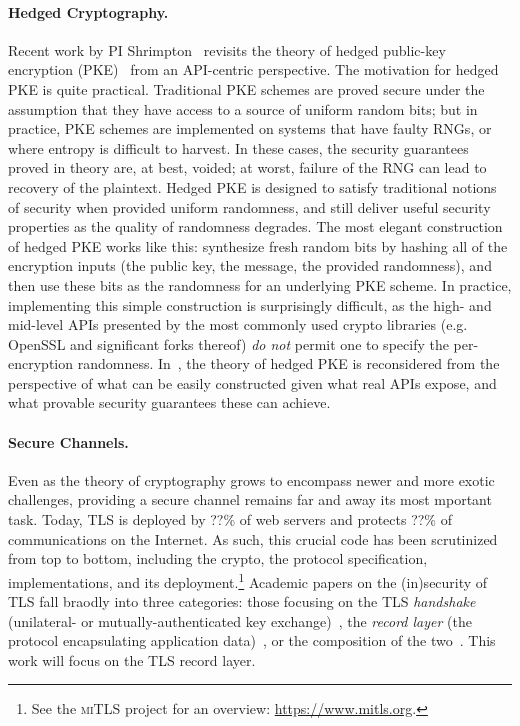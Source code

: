 \paragraph{Hedged Cryptography. }
Recent work by PI Shrimpton~\cite{BPS} revisits the theory of
hedged public-key encryption (PKE)~\cite{BBN+} from an API-centric perspective.
%
The motivation for hedged PKE is quite practical. Traditional
PKE schemes are proved secure under the assumption that they have access to a
source of uniform random bits; but in practice, PKE schemes are implemented on
systems that have faulty RNGs, or where entropy is difficult to harvest.  In
these cases, the security guarantees proved in theory are, at best, voided; at
worst, failure of the RNG can lead to recovery of the plaintext.
%
Hedged PKE is designed to satisfy traditional notions of security when provided
uniform randomness, and still deliver useful security properties as the quality
of randomness degrades.  The most elegant construction of hedged PKE works like
this: synthesize fresh random bits by hashing all of the encryption inputs (the
public key, the message, the provided randomness), and then use these bits as
the randomness for an underlying PKE scheme.  In practice, implementing this
simple construction is surprisingly difficult, as the high- and mid-level APIs
presented by the most commonly used crypto libraries (e.g. OpenSSL and
significant forks thereof) \emph{do not} permit one to specify the
per-encryption randomness.   In~\cite{BPS}, the theory of hedged PKE is
reconsidered from the perspective of what can be easily constructed given what
real APIs expose, and what provable security guarantees these can achieve.

\begin{task}
\end{task}

\paragraph{Secure Channels. }
Even as the theory of cryptography grows to encompass newer and more exotic
challenges, providing a secure channel remains far and away its most mportant
task.
%
Today, TLS is deployed by ??\% of web servers and protects ??\% of
communications on the Internet. As such, this crucial code has been scrutinized
from top to bottom, including the crypto, the protocol specification,
implementations, and its deployment.\footnote{ See the \textsc{miTLS} project
for an overview: \url{https://www.mitls.org}.}
%
Academic papers on the (in)security of TLS fall braodly into three categories:
those focusing on the TLS \emph{handshake} (unilateral- or
mutually-authenticated key exchange)~\cite{BNF+14,others}, the \emph{record
layer} (the protocol encapsulating application data)~\cite{PRS11}, or the
composition of the two~\cite{JKSS12,KPW13}. This work will focus on the TLS
record layer.

